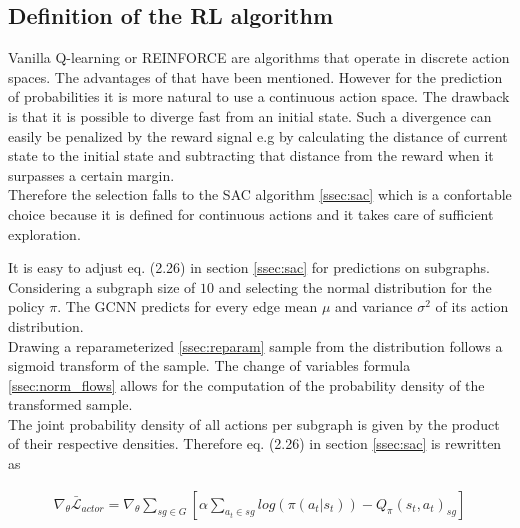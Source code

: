 \subsection{Definition of the RL algorithm}
Vanilla Q-learning or REINFORCE are algorithms that operate in discrete action spaces. The advantages of that have been mentioned. However for the prediction of probabilities it is more natural to use a continuous action space. The drawback is that it is possible to diverge fast from an initial state. Such a divergence can easily be penalized by the reward signal e.g by calculating the distance of current state to the initial state and subtracting that distance from the reward when it surpasses a certain margin. \\
Therefore the selection falls to the SAC algorithm \ref{ssec:sac} which is a confortable choice because it is defined for continuous actions and it takes care of sufficient exploration. 

It is easy to adjust eq. (2.26) in section \ref{ssec:sac} for predictions on subgraphs. Considering a subgraph size of $10$ and selecting the normal distribution for the policy $\pi$. The GCNN predicts for every edge mean $\mu$ and variance $\sigma ^2$ of its action distribution. \\
Drawing a reparameterized \ref{ssec:reparam} sample from the distribution follows a sigmoid transform of the sample. The change of variables formula \ref{ssec:norm_flows} allows for the computation of the probability density of the transformed sample. \\
The joint probability density of all actions per subgraph is given by the product of their respective densities. Therefore eq. (2.26) in section \ref{ssec:sac} is rewritten as

\begin{align}
	\nabla_\theta \bar{\mathcal{L}}_{actor} = \nabla_\theta \sum_{sg \in G} \left[ \alpha \sum_{a_t\in sg}log(\pi(a_t|s_t)) - Q_\pi(s_t, a_t)_{sg} \right]
\end{align}

